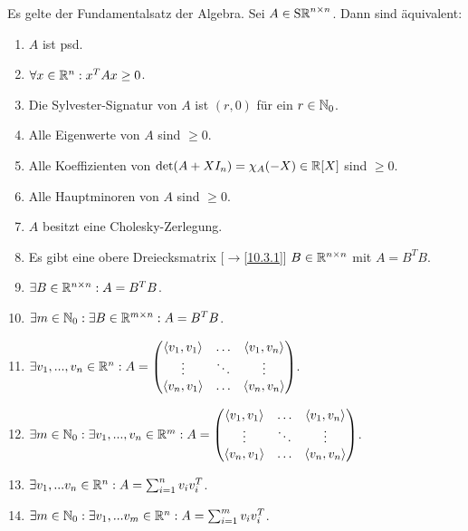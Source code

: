 \documentclass[../../main.tex]{subfiles}
\begin{document}
\begin{sat}\label{14.2.11}
Es gelte der Fundamentalsatz der Algebra. Sei $A\in\operatorname{S\mathbb R}^{n\times n}$. Dann sind äquivalent:
\begin{enumerate}[\normalfont(a)]
\item $A$ ist psd.
\item $\forall x\in \mathbb R^n: x^TAx\ge 0$.
\item Die Sylvester-Signatur von $A$ ist $(r,0)$ für ein $r\in \mathbb N_0$.
\item Alle Eigenwerte von $A$ sind $\ge 0$.
\item Alle Koeffizienten von $\det(A+XI_n)=\chi_A(-X)\in \mathbb R[X]$ sind $\ge 0$.
\item Alle Hauptminoren von $A$ sind $\ge 0$.
\item $A$ besitzt eine Cholesky-Zerlegung.
\item Es gibt eine obere Dreiecksmatrix [$\to$\ref{10.3.1}] $B\in \mathbb R^{n\times n}$ mit $A=B^TB$.
\item $\exists B\in \mathbb R^{n\times n}: A=B^TB$.
\item $\exists m\in \mathbb N_0: \exists B\in \mathbb R^{m\times n}: A=B^TB$.
\item $\exists v_1,...,v_n\in \R^n: A=\begin{pmatrix*}\scal{v_1,v_1}&\hdots&\scal{v_1,v_n}\\\vdots &\ddots&\vdots\\ \scal{v_n,v_1}&\hdots&\scal{v_n,v_n}\end{pmatrix*}$.
\item $\exists m\in \N_0:\exists v_1,...,v_n\in \R^m: A=\begin{pmatrix*}\scal{v_1,v_1}&\hdots&\scal{v_1,v_n}\\\vdots&\ddots&\vdots\\ \scal{v_n,v_1}&\hdots&\scal{v_n,v_n}\end{pmatrix*}$.
\item $\exists v_1,...v_n\in \mathbb R^n: A=\sum_{i=1}^n v_iv_i^T$.
\item $\exists m\in \mathbb N_0:\exists v_1,...v_m\in \mathbb R^n: A=\sum_{i=1}^m v_iv_i^T$.
\end{enumerate}	 
\end{sat}
\end{document}
